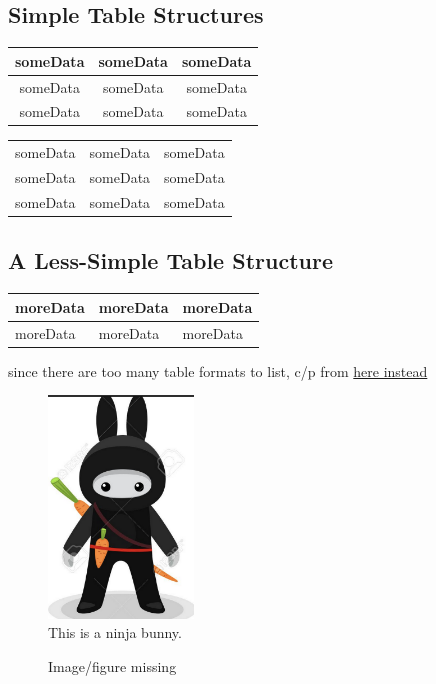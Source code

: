\documentclass[12pt,twoside,a4paper]{article}
\begin{document}
\subsection*{Simple Table Structures}

\begin{tabular}{ c |c| c }
 someData & someData & someData \\
 \hline
 someData & someData & someData \\
 someData & someData & someData
\end{tabular}

\begin{tabular}{ |c|c|c| }
\hline
 someData & someData & someData \\
 someData & someData & someData \\
 someData & someData & someData \\
\hline
\end{tabular}

\subsection*{A Less-Simple Table Structure}
\begin{tabularx}{0.8\textwidth} {
  | >{\raggedright\arraybackslash}X
  | >{\centering\arraybackslash}X
  | >{\raggedleft\arraybackslash}X | }
 \hline
 moreData & moreData & moreData \\
 \hline
 moreData & moreData & moreData \\
\hline
\end{tabularx}
\newline since there are too many table formats to list, c/p from \href{https://www.overleaf.com/learn/latex/tables}{here instead}

\begin{figure}[htbp]
  \centering
  \includegraphics[width=0.345\textwidth]{ninjaBunny.jpg}
  \caption{This is a ninja bunny.}
\end{figure}

\begin{figure}[htbp]
  \centering
  \caption{Image/figure missing}
\end{figure}
\end{document}
